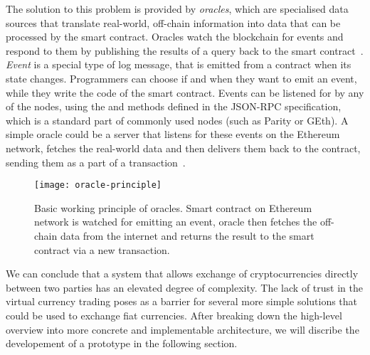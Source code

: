 The solution to this problem is provided by \textit{oracles}, which are specialised data sources that translate real-world, off-chain information into data that can be processed by the smart contract. Oracles watch the blockchain for events and respond to them by publishing the results of a query back to the smart contract~\cite{JohnWeldon2016BuildingContract}. \textit{Event} is a special type of log message, that is emitted from a contract when its state changes. Programmers can choose if and when they want to emit an event, while they write the code of the smart contract. Events can be listened for by any of the nodes, using the  and  methods defined in the JSON-RPC specification\footnotemark, which is a standard part of commonly used nodes (such as Parity or GEth). A simple oracle could be a server that listens for these events on the Ethereum network, fetches the real-world data and then delivers them back to the contract, sending them as a part of a transaction~\cite{JulesDourlens2017Oracles:Blockchain, 2018OraclizeDocumentation}. 
% 
% 
\begin{figure}[ht]
    \centering
    \texttt{[image: oracle-principle]}
    \caption{Basic working principle of oracles. Smart contract on Ethereum network is watched for emitting an event, oracle then fetches the off-chain data from the internet and returns the result to the smart contract via a new transaction.}
    \label{fig:oracles-principle}
\end{figure}

We can conclude that a system that allows exchange of cryptocurrencies directly between two parties has an elevated degree of complexity. The lack of trust in the virtual currency trading poses as a barrier for several more simple solutions that could be used to exchange fiat currencies. After breaking down the high-level overview into more concrete and implementable architecture, we will discribe the developement of a prototype in the following section.